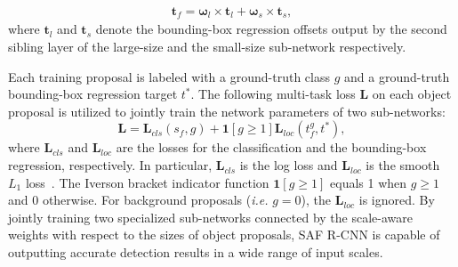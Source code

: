 \documentclass[journal]{IEEEtran}
\begin{document}
\begin{equation}
	\begin{aligned}
		\boldsymbol{t}_f = \boldsymbol{\omega}_l \times \boldsymbol{t}_l + \boldsymbol{\omega}_s \times \boldsymbol{t}_s,
	\end{aligned}
\end{equation}
where $\boldsymbol{t}_l$ and $\boldsymbol{t}_s$ denote the bounding-box regression offsets output by the second sibling layer of the large-size and the small-size sub-network respectively. 

Each training proposal is labeled with a ground-truth class $g$ and a ground-truth bounding-box regression target $t^{*}$. The following multi-task loss $\boldsymbol{L}$ on each object proposal is utilized to jointly train the network parameters of two sub-networks:
\begin{equation}\label{eqn:loss}
\boldsymbol{L} = \boldsymbol{L}_{cls}(s_f,g)+\mathbf{1}[g\geq 1]\boldsymbol{L}_{loc}({t}_f^g, t^{*}),
\end{equation}
where $\boldsymbol{L}_{cls}$ and $\boldsymbol{L}_{loc}$ are the losses for the classification and the bounding-box regression, respectively. In particular, $\boldsymbol{L}_{cls}$ is the log loss and $\boldsymbol{L}_{loc}$ is the smooth $L_1$ loss~\cite{girshick2015fast}. The Iverson bracket indicator function $\mathbf{1}[g\geq 1]$ equals 1 when $g\geq 1$ and 0 otherwise. For background proposals (\emph{i.e. }$g=0$), the $\boldsymbol{L}_{loc}$ is ignored. By jointly training two specialized sub-networks connected by the scale-aware weights with respect to the sizes of object proposals, SAF R-CNN is capable of outputting accurate detection results in a wide range of input scales.


\end{document}
